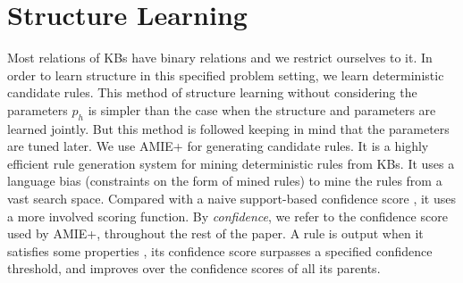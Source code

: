 \documentclass[akbc,twoside,11pt]{article}
\newcommand{\ondrej}[1]{\textcolor{red}{O: {#1}}}
\newcommand{\arcchit}[1]{\textcolor{blue}{A: {#1}}}
\newcommand{\algorithmname}{SafeLearner\xspace}
\begin{document}
\section{Structure Learning}
\label{sec:structure_learning}
Most relations of KBs have binary relations and we restrict ourselves to it. In order to learn structure in this specified problem setting, we learn deterministic candidate rules. %
This method of structure learning without considering the parameters $p_h$ is simpler than the case when the structure and parameters are learned jointly. But this method is followed keeping in mind that the parameters are tuned later. 
We use AMIE+ for generating candidate rules. It is a highly efficient rule generation system for mining deterministic rules from KBs. It uses a language bias (constraints on the form of mined rules) to mine the rules from a vast search space. Compared with a naive support-based confidence score \cite{DBLP:conf/sigmod/AgrawalIS93}, it uses a more involved scoring function. %
By \textit{confidence}, we refer to the confidence score used by AMIE+, throughout the rest of the paper. A rule is output when it satisfies some properties \citep{DBLP:journals/vldb/GalarragaTHS15}, its confidence score surpasses a specified confidence threshold, and improves over the confidence scores of all its parents.

\end{document}
